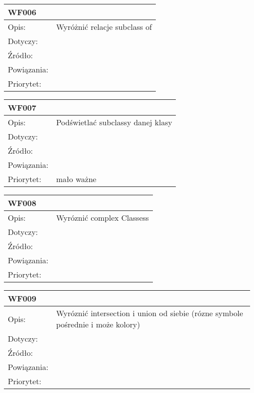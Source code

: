 \documentclass[a4paper,10pt]{article}
\begin{document}
\begin{tabular}{|p{3cm}|p{9cm}|} \hline

WF006 &  \\ \hline
Opis: & Wyróżnić relacje subclass of     \\ \hline
Dotyczy: &  \\ \hline
Źródło: &  \\ \hline
Powiązania: & \\ \hline
Priorytet: &  \\ \hline

\end{tabular}


\begin{tabular}{|p{3cm}|p{9cm}|} \hline

WF007 &  \\ \hline
Opis: &   Podświetlać subclassy danej klasy  \\ \hline
Dotyczy: &  \\ \hline
Źródło: &  \\ \hline
Powiązania: & \\ \hline
Priorytet: & mało ważne \\ \hline

\end{tabular}


\begin{tabular}{|p{3cm}|p{9cm}|} \hline

WF008 &  \\ \hline
Opis: &   Wyróznić complex Classess  \\ \hline
Dotyczy: &  \\ \hline
Źródło: &  \\ \hline
Powiązania: & \\ \hline
Priorytet: &  \\ \hline

\end{tabular}



\begin{tabular}{|p{3cm}|p{9cm}|} \hline

WF009 &  \\ \hline
Opis: &   Wyróznić intersection i union od siebie (rózne symbole pośrednie i może kolory)  \\ \hline
Dotyczy: &  \\ \hline
Źródło: &  \\ \hline
Powiązania: & \\ \hline
Priorytet: &  \\ \hline

\end{tabular}
\end{document}
